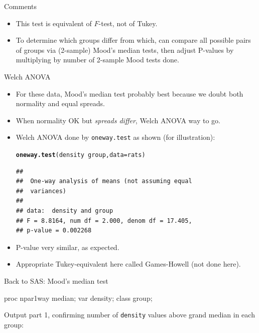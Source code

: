 \documentclass[unknownkeysallowed]{beamer}\usepackage[]{graphicx}\usepackage[]{color}
\makeatletter
\newcommand{\hlopt}[1]{\textcolor[rgb]{0,0,0}{#1}}%
\newcommand{\hlstd}[1]{\textcolor[rgb]{0.345,0.345,0.345}{#1}}%
\newcommand{\hlkwc}[1]{\textcolor[rgb]{0.333,0.667,0.333}{#1}}%
\newcommand{\hlkwd}[1]{\textcolor[rgb]{0.737,0.353,0.396}{\textbf{#1}}}%
\newenvironment{kframe}{%
 \def\at@end@of@kframe{}%
 \ifinner\ifhmode%
  \def\at@end@of@kframe{\end{minipage}}%
  \begin{minipage}{\columnwidth}%
 \fi\fi%
 \def\FrameCommand##1{\hskip\@totalleftmargin \hskip-\fboxsep
 \colorbox{shadecolor}{##1}\hskip-\fboxsep
     \hskip-\linewidth \hskip-\@totalleftmargin \hskip\columnwidth}%
 \MakeFramed {\advance\hsize-\width
   \@totalleftmargin\z@ \linewidth\hsize
   \@setminipage}}%
 {\par\unskip\endMakeFramed%
 \at@end@of@kframe}
\newenvironment{knitrout}{}{} %
\makeatother
\begin{document}
\begin{frame}[fragile]{Comments}
  
  \begin{itemize}
  \item This test is equivalent of $F$-test, not of Tukey.
\item To determine which groups differ from which, can compare all
  possible pairs of groups via (2-sample) Mood's median tests, then
  adjust P-values by multiplying by number of 2-sample Mood tests done.
  \end{itemize}
  
\end{frame}

\begin{frame}[fragile]{Welch ANOVA}
  
  \begin{itemize}
  \item For these data, Mood's median test probably best because we
    doubt both normality and equal spreads.
    \item When normality OK but \emph{spreads differ}, Welch ANOVA way
      to go. 
  \item Welch ANOVA done by \texttt{oneway.test} as shown (for illustration):
    
\begin{knitrout}
\color{fgcolor}\begin{kframe}
\begin{alltt}
\hlkwd{oneway.test}\hlstd{(density}\hlopt{~}\hlstd{group,}\hlkwc{data}\hlstd{=rats)}
\end{alltt}
\begin{verbatim}
## 
## 	One-way analysis of means (not assuming equal
## 	variances)
## 
## data:  density and group
## F = 8.8164, num df = 2.000, denom df = 17.405,
## p-value = 0.002268
\end{verbatim}
\end{kframe}
\end{knitrout}
\item P-value very similar, as expected.
\item Appropriate Tukey-equivalent here called Games-Howell (not done here).
  \end{itemize}
  
\end{frame}

\begin{frame}[fragile]{Back to SAS: Mood's median test}
  
  \begin{Sascode}[store=ja]
proc npar1way median;
  var density;
  class group;
  \end{Sascode}
  
  Output part 1, confirming number of \texttt{density} values above
  grand median in each group:
  
  
\end{frame}
\end{document}
